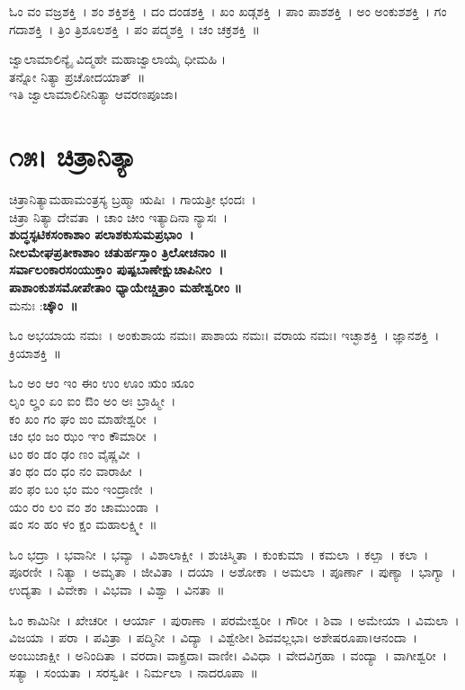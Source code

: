ಓಂ ವಂ ವಜ್ರಶಕ್ತಿ~।  ಶಂ ಶಕ್ತಿಶಕ್ತಿ~।  ದಂ ದಂಡಶಕ್ತಿ~।  ಖಂ ಖಡ್ಗಶಕ್ತಿ~।  ಪಾಂ ಪಾಶಶಕ್ತಿ~।  ಅಂ ಅಂಕುಶಶಕ್ತಿ~।  ಗಂ ಗದಾಶಕ್ತಿ~।  ತ್ರಿಂ ತ್ರಿಶೂಲಶಕ್ತಿ~।  ಪಂ ಪದ್ಮಶಕ್ತಿ~।  ಚಂ ಚಕ್ರಶಕ್ತಿ~॥

ಜ್ವಾಲಾಮಾಲಿನ್ಯೈ ವಿದ್ಮಹೇ ಮಹಾಜ್ವಾಲಾಯೈ ಧೀಮಹಿ ।\\ತನ್ನೋ ನಿತ್ಯಾ ಪ್ರಚೋದಯಾತ್~॥\\
ಇತಿ ಜ್ವಾಲಾಮಾಲಿನೀನಿತ್ಯಾ ಆವರಣಪೂಜಾ।
\section{೧೫। ಚಿತ್ರಾನಿತ್ಯಾ}
ಚಿತ್ರಾನಿತ್ಯಾಮಹಾಮಂತ್ರಸ್ಯ ಬ್ರಹ್ಮಾ ಋಷಿಃ~। ಗಾಯತ್ರೀ ಛಂದಃ~। \\ಚಿತ್ರಾ ನಿತ್ಯಾ ದೇವತಾ~। ಚಾಂ ಚೀಂ ಇತ್ಯಾದಿನಾ ನ್ಯಾಸಃ~।\\
{\bfseries ಶುದ್ಧಸ್ಫಟಿಕಸಂಕಾಶಾಂ ಪಲಾಶಕುಸುಮಪ್ರಭಾಂ~।\\
ನೀಲಮೇಘಪ್ರತೀಕಾಶಾಂ ಚತುರ್ಹಸ್ತಾಂ ತ್ರಿಲೋಚನಾಂ ॥\\
ಸರ್ವಾಲಂಕಾರಸಂಯುಕ್ತಾಂ ಪುಷ್ಪಬಾಣೇಕ್ಷುಚಾಪಿನೀಂ~।\\
ಪಾಶಾಂಕುಶಸಮೋಪೇತಾಂ ಧ್ಯಾಯೇಚ್ಚಿತ್ರಾಂ ಮಹೇಶ್ವರೀಂ ॥\\}
ಮನುಃ :{\bfseries  ಚ್ಕೌಂ~॥}

ಓಂ ಅಭಯಾಯ ನಮಃ~।  ಅಂಕುಶಾಯ ನಮಃ।  ಪಾಶಾಯ ನಮಃ।  ವರಾಯ ನಮಃ।  ಇಚ್ಛಾಶಕ್ತಿ~।  ಜ್ಞಾನಶಕ್ತಿ~।  ಕ್ರಿಯಾಶಕ್ತಿ~॥ 

ಓಂ ಅಂ ಆಂ ಇಂ ಈಂ ಉಂ ಊಂ ಋಂ ೠಂ \\ಲೃಂ ಲೄಂ ಏಂ ಐಂ  ಔಂ ಅಂ ಅಃ ಬ್ರಾಹ್ಮೀ~।\\  ಕಂ ಖಂ ಗಂ ಘಂ ಙಂ ಮಾಹೇಶ್ವರೀ~।\\  ಚಂ ಛಂ ಜಂ ಝಂ ಞಂ ಕೌಮಾರೀ~।\\  ಟಂ ಠಂ ಡಂ ಢಂ ಣಂ ವೈಷ್ಣವೀ~। \\ತಂ ಥಂ ದಂ ಧಂ ನಂ ವಾರಾಹೀ~। \\ಪಂ ಫಂ ಬಂ ಭಂ ಮಂ ಇಂದ್ರಾಣೀ~। \\ ಯಂ ರಂ ಲಂ ವಂ ಶಂ ಚಾಮುಂಡಾ~। \\ ಷಂ ಸಂ ಹಂ ಳಂ ಕ್ಷಂ ಮಹಾಲಕ್ಷ್ಮೀ~॥ 

ಓಂ ಭದ್ರಾ~।  ಭವಾನೀ~।  ಭವ್ಯಾ~।  ವಿಶಾಲಾಕ್ಷೀ~।  ಶುಚಿಸ್ಮಿತಾ~।  ಕುಂಕುಮಾ~।  ಕಮಲಾ~।  ಕಲ್ಪಾ~।  ಕಲಾ~।  ಪೂರಣೀ~।  ನಿತ್ಯಾ~।  ಅಮೃತಾ~।  ಜೀವಿತಾ~।  ದಯಾ~।  ಅಶೋಕಾ~।  ಅಮಲಾ~।  ಪೂರ್ಣಾ~।  ಪುಣ್ಯಾ~।  ಭಾಗ್ಯಾ~।  ಉದ್ಯತಾ~।  ವಿವೇಕಾ~।  ವಿಭವಾ~।  ವಿಶ್ವಾ~।  ವಿನತಾ~॥ 

ಓಂ ಕಾಮಿನೀ~।  ಖೇಚರೀ~।  ಆರ್ಯಾ~।  ಪುರಾಣಾ~।  ಪರಮೇಶ್ವರೀ~।  ಗೌರೀ~।  ಶಿವಾ~।  ಅಮೇಯಾ~।  ವಿಮಲಾ~।  ವಿಜಯಾ~।  ಪರಾ~।  ಪವಿತ್ರಾ~।  ಪದ್ಮಿನೀ~।  ವಿದ್ಯಾ~।  ವಿಶ್ವೇಶೀ। ಶಿವವಲ್ಲಭಾ। ಅಶೇಷರೂಪಾ।ಆನಂದಾ~।  ಅಂಬುಜಾಕ್ಷೀ~।  ಅನಿಂದಿತಾ~।  ವರದಾ। ವಾಕ್ಪ್ರದಾ। ವಾಣೀ।  ವಿವಿಧಾ~।  ವೇದವಿಗ್ರಹಾ~।  ವಂದ್ಯಾ~।  ವಾಗೀಶ್ವರೀ~।  ಸತ್ಯಾ~।  ಸಂಯತಾ~।  ಸರಸ್ವತೀ~।  ನಿರ್ಮಲಾ~।  ನಾದರೂಪಾ~॥

